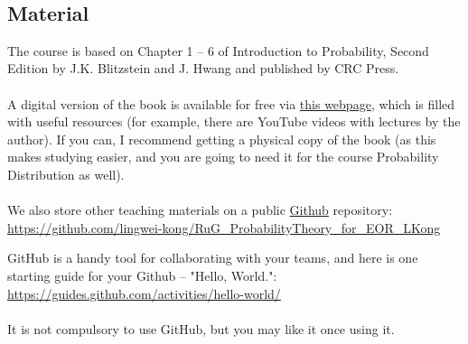 \documentclass[openany]{article}
\begin{document}
~\\ \clearpage
\subsection{Material}
The course is based on Chapter 1 – 6 of Introduction to Probability, Second Edition by J.K. Blitzstein and J. Hwang and published by CRC Press. \\~\\
A digital version of the book is available for free via \href{https://projects.iq.harvard.edu/stat110/home}{this webpage}, which
is filled with useful resources (for example, there are YouTube videos with
lectures by the author). If you can, I recommend getting a physical copy of
the book (as this makes studying easier, and you are going to need it for the course Probability Distribution as well). \\~\\
We also store other teaching materials on a public \href{https://github.com/}{Github} repository:\\ \href{https://github.com/lingwei-kong/RuG_ProbabilityTheory_for_EOR_LKong}{https://github.com/lingwei-kong/RuG\_ProbabilityTheory\_for\_EOR\_LKong}

GitHub is a handy tool for collaborating with your teams, and here is one starting guide for your Github -- "Hello, World.":
\href{https://guides.github.com/activities/hello-world/}{https://guides.github.com/activities/hello-world/} \\~\\
It is not compulsory to use GitHub, but you may like it once using it.
\end{document}
